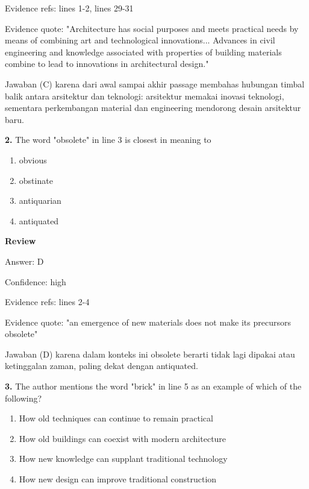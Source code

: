 \documentclass[12pt]{article}
\begin{document}
Evidence refs: lines 1-2, lines 29-31\par
Evidence quote: "Architecture has social purposes and meets practical needs by means of combining art and technological innovations... Advances in civil engineering and knowledge associated with properties of building materials combine to lead to innovations in architectural design."\par
Jawaban (C) karena dari awal sampai akhir passage membahas hubungan timbal balik antara arsitektur dan teknologi: arsitektur memakai inovasi teknologi, sementara perkembangan material dan engineering mendorong desain arsitektur baru.\par
\endgroup
\par
\vspace{0.25\baselineskip}
\noindent\textbf{2.} The word "obsolete" in line 3 is closest in meaning to
\begin{enumerate}[label=(\Alph*),leftmargin=*,itemsep=0.2em]
\item obvious
\item obstinate
\item antiquarian
\item antiquated
\end{enumerate}
\par
\begingroup
\setlength{\parskip}{0pt}
\setlength{\parindent}{0pt}
\textbf{Review}\par
Answer: D\par
Confidence: high\par
Evidence refs: lines 2-4\par
Evidence quote: "an emergence of new materials does not make its precursors obsolete"\par
Jawaban (D) karena dalam konteks ini obsolete berarti tidak lagi dipakai atau ketinggalan zaman, paling dekat dengan antiquated.\par
\endgroup
\par
\vspace{0.25\baselineskip}
\noindent\textbf{3.} The author mentions the word "brick" in line 5 as an example of which of the following?
\begin{enumerate}[label=(\Alph*),leftmargin=*,itemsep=0.2em]
\item How old techniques can continue to remain practical
\item How old buildings can coexist with modern architecture
\item How new knowledge can supplant traditional technology
\item How new design can improve traditional construction
\end{enumerate}
\end{document}
